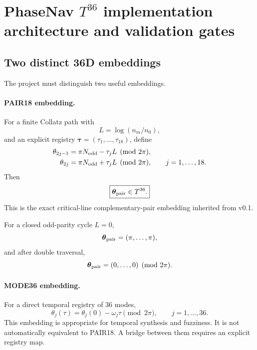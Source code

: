 \section{PhaseNav \(T^{36}\) implementation architecture and validation gates}

\subsection{Two distinct 36D embeddings}

The project must distinguish two useful embeddings.

\paragraph{PAIR18 embedding.}
For a finite Collatz path with
\begin{equation}
L=\log(n_m/n_0),
\end{equation}
and an explicit registry \(\boldsymbol\tau=(\tau_1,\ldots,\tau_{18})\), define
\begin{align}
\theta_{2j-1}&=\pi N_{\rm odd}-\tau_jL\pmod{2\pi},\\
\theta_{2j}&=\pi N_{\rm odd}+\tau_jL\pmod{2\pi},
\qquad j=1,\ldots,18.
\end{align}
Then
\begin{equation}
\boxed{\boldsymbol\theta_{\rm pair}\in T^{36}.}
\end{equation}
This is the exact critical-line complementary-pair embedding inherited from v0.1.

For a closed odd-parity cycle \(L=0\),
\begin{equation}
\boldsymbol\theta_{\rm pair}=(\pi,\ldots,\pi),
\end{equation}
and after double traversal,
\begin{equation}
\boldsymbol\theta_{\rm pair}=(0,\ldots,0)\pmod{2\pi}.
\end{equation}

\paragraph{MODE36 embedding.}
For a direct temporal registry of 36 modes,
\begin{equation}
\theta_j(\tau)=\theta_j(0)-\omega_j\tau\pmod{2\pi},
\qquad j=1,\ldots,36.
\end{equation}
This embedding is appropriate for temporal synthesis and fuzziness. It is not automatically equivalent to PAIR18. A bridge between them requires an explicit registry map.

